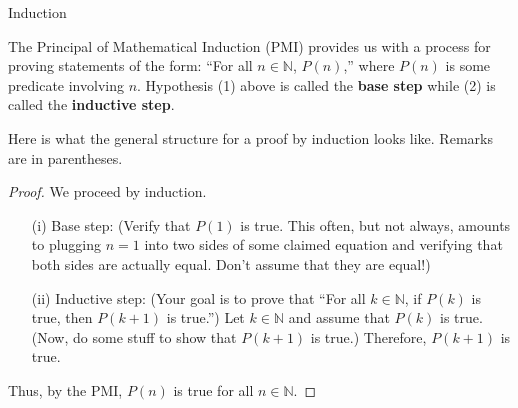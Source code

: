 \begin{section}{Induction}
\begin{remark}
The Principal of Mathematical Induction (PMI) provides us with a process for proving statements of the form: ``For all \(n\in\mathbb{N}\), \(P(n)\),'' where \(P(n)\) is some predicate involving \(n\).  Hypothesis (1) above is called the \textbf{base step} while (2) is called the \textbf{inductive step}.
\end{remark} 

\begin{skeleton}
Here is what the general structure for a proof by induction looks like.  Remarks are in parentheses.

\bigskip

\begin{textbox}
\begin{proof}
We proceed by induction.
\begin{enumerate}
\item[(i)] Base step: (Verify that \(P(1)\) is true.  This often, but not always, amounts to plugging \(n=1\) into two sides of some claimed equation and verifying that both sides are actually equal.  Don't assume that they are equal!)

\item[(ii)] Inductive step:  (Your goal is to prove that ``For all \(k\in\mathbb{N}\), if \(P(k)\) is true, then \(P(k+1)\) is true.'')  Let \(k\in\mathbb{N}\) and assume that \(P(k)\) is true.  (Now, do some stuff to show that \(P(k+1)\) is true.)  Therefore, \(P(k+1)\) is true.
\end{enumerate}
Thus, by the PMI, \(P(n)\) is true for all \(n\in\mathbb{N}\).
\end{proof}
\end{textbox}

\end{skeleton}

\end{section}
